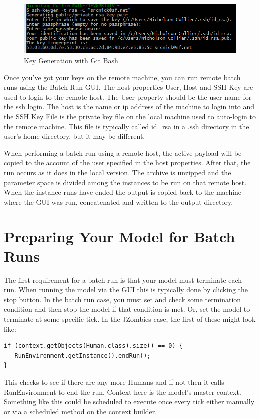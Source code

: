 \documentclass[11pt]{amsart}
\begin{document}
\begin{figure}[h]
\begin{center}
\vspace{.2in}
\centerline {
\includegraphics[width=6in]{images/win_ssh.png}
}
\caption{Key Generation with Git Bash}
\label{fig:win_ssh}
\end{center}
\end{figure}


Once you've got your keys on the remote machine, you can run remote batch runs using the Batch Run GUI. The host properties User, Host and SSH Key are used to login to the remote host. The User property should be the user name for the ssh login. The host is the name or ip address of the machine to login into and the SSH Key File is the private key file on the local machine used to auto-login to the remote machine. This file is typically called id\_rsa in a .ssh directory in the user's home directory,  but it may be different.

When performing a batch run using a remote host, the active payload will be copied to the account of the user specified in the host properties. After that, the run occurs as it does in the local version. The archive is unzipped and the parameter space is divided among the instances to be run on that remote host. When the instance runs have ended the output is copied back to the machine where the GUI was run, concatenated and written to the output directory.

\section{Preparing Your Model for Batch Runs}

The first requirement for a batch run is that your model must terminate each run. When running the model via the GUI this is typically done by clicking the stop button. In the batch run case, you must set and check some termination condition and then stop the model if that condition is met. Or, set the model to terminate at some specific tick. In the JZombies case, the first of these might look like:

\begin{verbatim}
if (context.getObjects(Human.class).size() == 0) {
   RunEnvironment.getInstance().endRun();
}
\end{verbatim}
\noindent
This checks to see if there are any more Humans and if not then it calls RunEnvironment to end the run. Context here is the model's master context. Something like this could be scheduled to execute once every tick either manually or via a scheduled method on the context builder.
\end{document}
